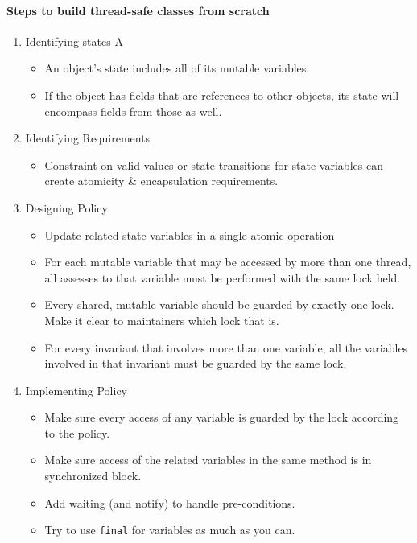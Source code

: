 \documentclass[a4paper]{article}
\begin{document}
\paragraph{Steps to build thread-safe classes from scratch}
\begin{enumerate}
	\item Identifying states A
	\begin{itemize}
		\item An object's state includes all of its mutable variables.
		\item If the object has fields that are references to other objects, its state will encompass fields from those as well.
	\end{itemize}
	\item Identifying Requirements
	\begin{itemize}
	\item Constraint on valid values or state transitions for state variables can create atomicity \& encapsulation requirements.
	\end{itemize}
	\item Designing Policy
	\begin{itemize}
		\item Update related state variables in a single atomic operation
		\item For each mutable variable that may be accessed by more than one thread, all assesses to that variable must be performed with the same lock held.
		\item Every shared, mutable variable should be guarded by exactly one lock. Make it clear to maintainers which lock that is.
		\item For every invariant that involves more than one variable, all the variables involved in that invariant must be guarded by the same lock.
	\end{itemize}
	\item Implementing Policy
	\begin{itemize}
		\item Make sure every access of any variable is guarded by the lock according to the policy.
		\item Make sure access of the related variables in the same method is in synchronized block.
		\item Add waiting (and notify) to handle pre-conditions.
		\item Try to use \texttt{final} for variables as much as you can.
	\end{itemize}
\end{enumerate}
\end{document}
